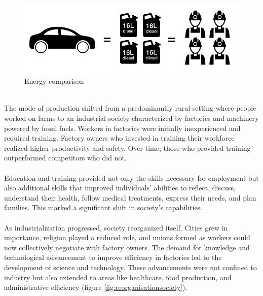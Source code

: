 \documentclass[../summary.tex]{subfiles}
\begin{document}
\begin{figure}[H]
	\centering
	\includegraphics[width=0.7\linewidth]{../images/mine_worker}
	\caption{Energy comparison}
	\label{fig:mineworker}
\end{figure}
\ \\
The mode of production shifted from a predominantly rural setting where people worked on farms to an industrial society characterized by factories and machinery powered by fossil fuels. Workers in factories were initially inexperienced and required training. Factory owners who invested in training their workforce realized higher productivity and safety. Over time, those who provided training outperformed competitors who did not.\\
\\
Education and training provided not only the skills necessary for employment but also additional skills that improved individuals' abilities to reflect, discuss, understand their health, follow medical treatments, express their needs, and plan families. This marked a significant shift in society's capabilities.\\
\\
As industrialization progressed, society reorganized itself. Cities grew in importance, religion played a reduced role, and unions formed as workers could now collectively negotiate with factory owners. The demand for knowledge and technological advancement to improve efficiency in factories led to the development of science and technology. These advancements were not confined to industry but also extended to areas like healthcare, food production, and administrative efficiency (figure \ref{fig:reorganisationsociety}).
\end{document}
